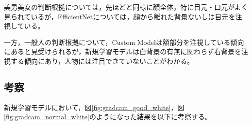 \documentclass[a4paper,11pt,titlepage]{jsarticle}
\begin{document}
美男美女の判断根拠については，先ほどと同様に顔全体，特に目元・口元がよく見られているが，EfficientNetについては，顔から離れた背景ないしは目元を注視している。\par
一方，一般人の判断根拠について，Custom Modelは額部分を注視している傾向にあると見受けられるが，新規学習モデルは白背景の有無に関わらず右背景を注視する傾向にあり，人物には注目できていないことがわかる。


\subsection{考察}

新規学習モデルにおいて，図\ref{fig:gradcam_good_white}，図\ref{fig:gradcam_normal_white}のようになった結果を以下に考察する。
\end{document}
